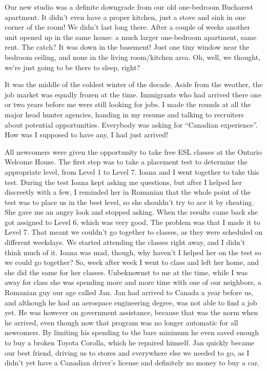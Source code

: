 \documentclass[12pt]{book}
\begin{document}
Our new studio was a definite downgrade from our old one-bedroom
Bucharest apartment. It didn't even have a proper kitchen, just a stove
and sink in one corner of the room! We didn't last long there. After a
couple of weeks another unit opened up in the same house: a much larger
one-bedroom apartment, same rent. The catch? It was down in the
basement! Just one tiny window near the bedroom ceiling, and none in the
living room/kitchen area. Oh, well, we thought, we're just going to be
there to sleep, right?

It was the middle of the coldest winter of the decade. Aside from the
weather, the job market was equally frozen at the time. Immigrants who
had arrived there one or two years before me were still looking for
jobs. I made the rounds at all the major head hunter agencies, handing
in my resume and talking to recruiters about potential opportunities.
Everybody was asking for ``Canadian experience''. How was I supposed to
have any, I had just arrived!

All newcomers were given the opportunity to take free ESL classes at the
Ontario Welcome House. The first step was to take a placement test to
determine the appropriate level, from Level 1 to Level 7. Ioana and I
went together to take this test. During the test Ioana kept asking me
questions, but after I helped her discreetly with a few, I reminded her
in Romanian that the whole point of the test was to place us in the best
level, so she shouldn't try to ace it by cheating. She gave me an angry
look and stopped asking. When the results came back she got assigned to
Level 6, which was very good. The problem was that I made it to Level 7.
That meant we couldn't go together to classes, as they were scheduled on
different weekdays. We started attending the classes right away, and I
didn't think much of it. Ioana was mad, though, why haven't I helped her
on the test so we could go together? So, week after week I went to class
and left her home, and she did the same for her classes. Unbeknownst to
me at the time, while I was away for class she was spending more and
more time with one of our neighbors, a Romanian guy our age called Jan.
Jan had arrived to Canada a year before us, and although he had an
aerospace engineering degree, was not able to find a job yet. He was
however on government assistance, because that was the norm when he
arrived, even though now that program was no longer automatic for all
newcomers. By limiting his spending to the bare minimum he even saved
enough to buy a broken Toyota Corolla, which he repaired himself. Jan
quickly became our best friend, driving us to stores and everywhere else
we needed to go, as I didn't yet have a Canadian driver's license and
definitely no money to buy a car.
\end{document}
